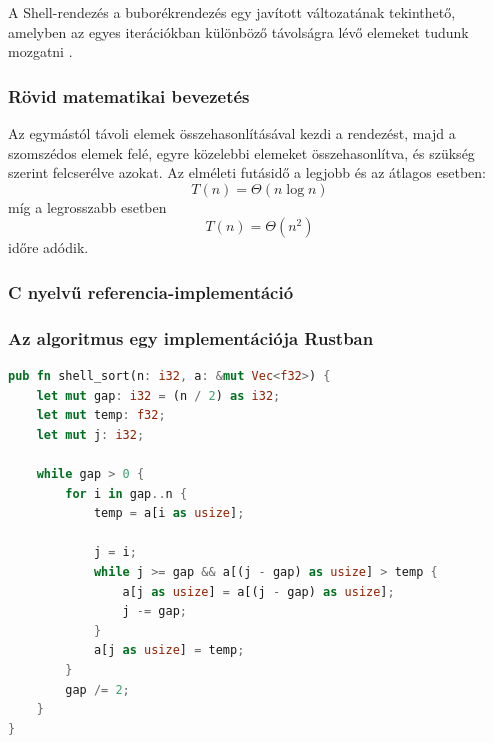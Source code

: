 
A Shell-rendezés a buborékrendezés egy javított változatának tekinthető, amelyben az egyes iterációkban különböző távolságra lévő elemeket tudunk mozgatni \cite{shellsort}.

\subsubsection{Rövid matematikai bevezetés}

Az egymástól távoli elemek összehasonlításával kezdi a rendezést, majd a szomszédos elemek felé, egyre közelebbi elemeket összehasonlítva, és szükség szerint felcserélve azokat. Az elméleti futásidő a legjobb és az átlagos esetben:
\[ T(n) = \Theta(n \log n) \]
míg a legrosszabb esetben
\[ T(n) = \Theta(n^2)\]
időre adódik.

\subsubsection{C nyelvű referencia-implementáció}

\subsubsection{Az algoritmus egy implementációja Rustban}
\begin{lstlisting}[language=Rust]
pub fn shell_sort(n: i32, a: &mut Vec<f32>) {
    let mut gap: i32 = (n / 2) as i32;
    let mut temp: f32;
    let mut j: i32;

    while gap > 0 {
        for i in gap..n {
            temp = a[i as usize];

            j = i;
            while j >= gap && a[(j - gap) as usize] > temp {
                a[j as usize] = a[(j - gap) as usize];
                j -= gap;
            }
            a[j as usize] = temp;
        }
        gap /= 2;
    }
}
\end{lstlisting}


